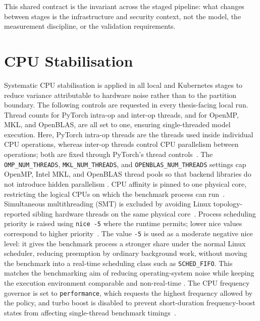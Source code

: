 This shared contract is the invariant across the staged pipeline: what changes between
stages is the infrastructure and security context, not the model, the measurement
discipline, or the validation requirements.

\section{CPU Stabilisation}
\label{sec:methods-cpu}

Systematic CPU stabilisation is applied in all local and Kubernetes stages to reduce
variance attributable to hardware noise rather than to the partition boundary.
The following controls are requested in every thesis-facing local run.
Thread counts for PyTorch intra-op and inter-op threads, and for OpenMP, MKL, and
OpenBLAS, are all set to one, ensuring single-threaded model execution. Here,
PyTorch intra-op threads are the threads used inside individual CPU operations,
whereas inter-op threads control CPU parallelism between operations; both are
fixed through PyTorch's thread controls~\cite{pytorch_set_num_threads,pytorch_set_num_interop_threads}.
The \texttt{OMP\_NUM\_THREADS}, \texttt{MKL\_NUM\_THREADS}, and
\texttt{OPENBLAS\_NUM\_THREADS} settings cap OpenMP, Intel MKL, and OpenBLAS
thread pools so that backend libraries do not introduce hidden parallelism
\cite{pytorch_threading_env,openblas_faq}. CPU affinity is pinned to one
physical core, restricting the logical CPUs on which the benchmark process can
run~\cite{linux_sched_setaffinity}. Simultaneous multithreading (SMT) is excluded
by avoiding Linux topology-reported sibling hardware threads on the same physical
core~\cite{linux_cpu_topology}. Process scheduling priority is raised using
\texttt{nice~-5} where the runtime permits; lower nice values correspond to higher
priority~\cite{linux_nice}. The value \texttt{-5} is used as a moderate negative
nice level: it gives the benchmark process a stronger share under the normal
Linux scheduler, reducing preemption by ordinary background work, without moving
the benchmark into a real-time scheduling class such as \texttt{SCHED\_FIFO}.
This matches the benchmarking aim of reducing operating-system noise while
keeping the execution environment comparable and non-real-time
\cite{benchmarking_sc15,noise_in_clouds,linux_sched_nice_design}. The CPU
frequency governor is set to \texttt{performance}, which requests the highest
frequency allowed by the policy, and turbo boost is disabled to prevent
short-duration frequency-boost states from affecting single-thread benchmark
timings~\cite{linux_cpufreq}.

